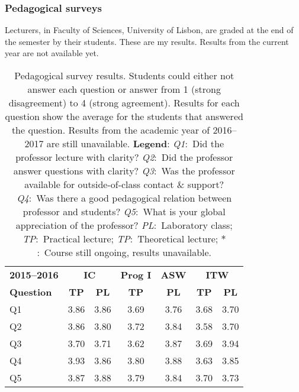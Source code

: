 \subsubsection{Pedagogical surveys}

Lecturers, in Faculty of Sciences, University of Lisbon, are graded at the end of the semester by their students. These are my results. Results from the current year are not available yet.

\begin{table}[H]
\centering
\caption{Pedagogical survey results. Students could either not answer each question or answer from 1 (strong disagreement) to 4 (strong agreement). Results for each question show the average for the students that answered the question. Results from the academic year of 2016--2017 are still unavailable.\hfill\break
\textbf{Legend}:\hfill\break
\textit{Q1}:~Did the professor lecture with clarity?\hfill\break
\textit{Q2}:~Did the professor answer questions with clarity?\hfill\break
\textit{Q3}:~Was the professor available for outside-of-class contact \& support?\hfill\break
\textit{Q4}:~Was there a good pedagogical relation between professor and students?\hfill\break
\textit{Q5}:~What is your global appreciation of the professor?\hfill\break
\textit{PL}:~Laboratory class;\hfill\break
\textit{TP}:~Practical lecture;\hfill\break
\textit{TP}:~Theoretical lecture;\hfill\break
\textit{$*$}:~Course still ongoing, results unavailable.}
\label{tab:surveys}
\vspace{5mm}
\begin{tabular}{lcccccc}
\toprule
\bfseries 2015--2016
 & \multicolumn{2}{c}{\bfseries IC}
 & \bfseries Prog I
 & \bfseries ASW
 & \multicolumn{2}{c}{\bfseries ITW} \\
\bfseries Question
 & \bfseries TP
 & \bfseries PL
 & \bfseries TP
 & \bfseries PL
 & \bfseries TP
 & \bfseries PL \\
\midrule
Q1 & 3.86 & 3.86 & 3.69 & 3.76 & 3.68 & 3.70 \\
Q2 & 3.86 & 3.80 & 3.72 & 3.84 & 3.58 & 3.70 \\
Q3 & 3.70 & 3.71 & 3.62 & 3.87 & 3.69 & 3.94 \\
Q4 & 3.93 & 3.86 & 3.80 & 3.88 & 3.63 & 3.85 \\
Q5 & 3.87 & 3.88 & 3.79 & 3.84 & 3.70 & 3.73 \\
\bottomrule
\end{tabular}

\vspace{5mm}


\end{table}
